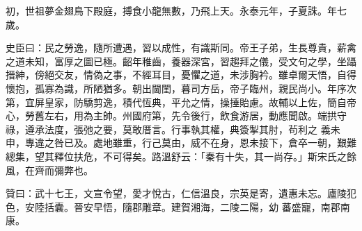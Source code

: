 \begin{pinyinscope}
 初，世祖夢金翅鳥下殿庭，搏食小龍無數，乃飛上天。永泰元年，子夏誅。年七歲。



 史臣曰：民之勞逸，隨所遭遇，習以成性，有識斯同。帝王子弟，生長尊貴，薪禽之道未知，富厚之圖已極。齠年稚齒，養器深宮，習趨拜之儀，受文句之學，坐躡搢紳，傍絕交友，情偽之事，不經耳目，憂懼之道，未涉胸衿。雖卓爾天悟，自得懷抱，孤寡為識，所陋猶多。朝出閫閨，暮司方岳，帝子臨州，親民尚小。年序次第，宜屏皇家，防驕剪逸，積代恆典，平允之情，操捶貽慮。故輔以上佐，簡自帝心，勞舊左右，用為主帥。州國府第，先令後行，飲食游居，動應聞啟。端拱守祿，遵承法度，張弛之要，莫敢厝言。行事執其權，典簽掣其肘，茍利之
 義未申，專違之咎已及。處地雖重，行己莫由，威不在身，恩未接下，倉卒一朝，艱難總集，望其釋位扶危，不可得矣。路溫舒云：「秦有十失，其一尚存。」斯宋氏之餘風，在齊而彌弊也。



 贊曰：武十七王，文宣令望，愛才悅古，仁信溫良，宗英是寄，遺惠未忘。廬陵犯色，安陸括囊。晉安早悟，隨郡雕章。建賀湘海，二陵二陽，幼
 蕃盛寵，南郡南康。



\end{pinyinscope}